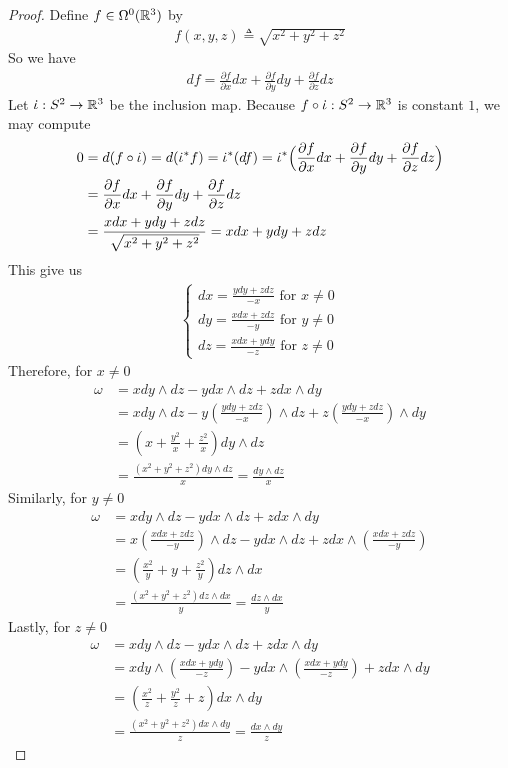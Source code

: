 \documentclass{report}
\begin{document}
\begin{proof}
Define  $f\in \Omega^0(\mathbb{R}^3)$ by 
\begin{align*}
f(x,y,z)\triangleq  \sqrt{x^2+y^2+z^2} 
\end{align*}
So we have 
\begin{align*}
df= \frac{\partial f}{\partial x}dx+ \frac{\partial f}{\partial y}dy + \frac{\partial f}{\partial z}dz
\end{align*}
Let $\dot{\iota}:S^2\rightarrow \mathbb{R}^3$ be the inclusion map. Because $f \circ \dot{\iota}:S^2\rightarrow \mathbb{R}^3$ is constant  $1$, we may compute 
\begin{align*}
  0&=d(f\circ \dot{\iota}  )=d(\dot{\iota}^* f )=\dot{\iota}^* (df)= \dot{\iota}^*\Big( \frac{\partial f}{\partial x}dx+  \frac{\partial f}{\partial y}dy + \frac{\partial f}{\partial z}dz \Big)   \\
  &=\frac{\partial f}{\partial x}dx+ \frac{\partial f}{\partial y}dy + \frac{\partial f}{\partial z}dz \\
  &=\frac{xdx+ydy+zdz}{\sqrt{x^2+y^2+z^2} }= xdx+ydy+zdz
\end{align*}
This give us 
\begin{align*}
\begin{cases}
dx= \frac{ydy + zdz}{-x}\text{ for }x\neq 0 \\
dy= \frac{xdx+zdz}{-y}\text{ for }y\neq 0\\
dz= \frac{xdx+ydy}{-z}\text{ for }z\neq 0
\end{cases}
\end{align*}
Therefore, for $x\neq 0$ 
\begin{align*}
\omega&= xdy \wedge dz- ydx\wedge  dz + zdx \wedge  dy      \\
&= xdy \wedge  dz- y (\frac{ydy+zdz}{-x}) \wedge dz+ z (\frac{ydy+zdz}{-x})\wedge  dy  \\
&=(x+ \frac{y^2}{x}+ \frac{z^2}{x})dy \wedge  dz \\
&=\frac{(x^2+y^2+z^2)dy \wedge  dz }{x}= \frac{dy \wedge  dz}{x}
\end{align*}
Similarly, for $y\neq 0$ 
\begin{align*}
\omega&=  xdy \wedge dz- ydx\wedge  dz + zdx \wedge  dy  \\
&=x(\frac{xdx+zdz}{-y}) \wedge  dz -ydx\wedge  dz + z dx \wedge  (\frac{xdx+zdz}{-y})    \\
&= (\frac{x^2}{y} +y + \frac{z^2}{y}) dz \wedge  dx \\
&=\frac{(x^2+y^2+z^2)dz\wedge  dx }{y}= \frac{dz \wedge  dx}{y}
\end{align*}
Lastly, for $z\neq 0$ 
\begin{align*}
\omega&=   xdy \wedge dz- ydx\wedge  dz + zdx \wedge  dy      \\
&= xdy\wedge  (\frac{xdx+ydy}{-z}) -ydx \wedge   (\frac{xdx+ydy}{-z})  + z dx\wedge  dy  \\
&= (\frac{x^2}{z}+ \frac{y^2}{z}+ z)dx \wedge  dy \\
&=\frac{(x^2+y^2+z^2)dx\wedge  dy }{z}= \frac{dx \wedge  dy }{z} 
\end{align*}
\end{proof}
\end{document}
